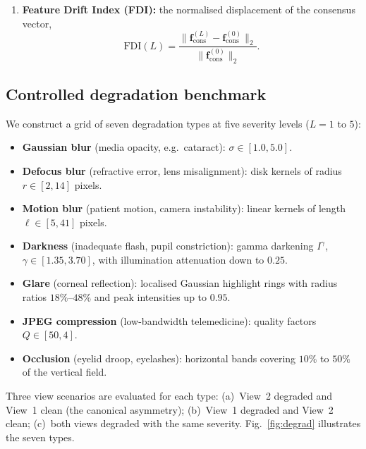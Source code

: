 \documentclass[final,5p,times,twocolumn,authoryear]{elsarticle}
\theoremstyle{plain}
\theoremstyle{remark}
\begin{document}
\begin{enumerate}
\begin{equation}
      \text{PFR}(L) = \frac{1}{M} \sum_{i=1}^M \mathbb{I}\left( \hat{y}^{(i)}(L) \neq \hat{y}^{(i)}(0) \right).
      \label{eq:pfr}
    \end{equation}
    A flip counts any change of grade, towards or away from the correct one, so PFR measures stability, not accuracy.
  \item \textbf{Feature Drift Index (FDI):} the normalised displacement of the consensus vector,
    \begin{equation}
      \text{FDI}(L) = \frac{\|\mathbf{f}_{\text{cons}}^{(L)} - \mathbf{f}_{\text{cons}}^{(0)}\|_2}{\|\mathbf{f}_{\text{cons}}^{(0)}\|_2}.
      \label{eq:fdi}
    \end{equation}
\end{enumerate}

\subsection{Controlled degradation benchmark}
\label{sec:degradation}

We construct a grid of seven degradation types at five severity levels ($L=1$ to $5$):
\begin{itemize}
  \item \textbf{Gaussian blur} (media opacity, e.g.\ cataract): $\sigma \in [1.0, 5.0]$.
  \item \textbf{Defocus blur} (refractive error, lens misalignment): disk kernels of radius $r \in [2, 14]$ pixels.
  \item \textbf{Motion blur} (patient motion, camera instability): linear kernels of length $\ell \in [5, 41]$ pixels.
  \item \textbf{Darkness} (inadequate flash, pupil constriction): gamma darkening $I^{\gamma}$, $\gamma \in [1.35, 3.70]$, with illumination attenuation down to $0.25$.
  \item \textbf{Glare} (corneal reflection): localised Gaussian highlight rings with radius ratios $18\%$--$48\%$ and peak intensities up to $0.95$.
  \item \textbf{JPEG compression} (low-bandwidth telemedicine): quality factors $Q \in [50, 4]$.
  \item \textbf{Occlusion} (eyelid droop, eyelashes): horizontal bands covering $10\%$ to $50\%$ of the vertical field.
\end{itemize}
Three view scenarios are evaluated for each type: (a)~View~2 degraded and View~1 clean (the canonical asymmetry); (b)~View~1 degraded and View~2 clean; (c)~both views degraded with the same severity. Fig.~\ref{fig:degrad} illustrates the seven types.
\end{document}

